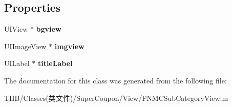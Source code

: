 \subsection*{Properties}
\begin{DoxyCompactItemize}
\item 
\mbox{\label{interface_f_n_m_c_sub_category_cell_a642c00ee41c755f90240331a4d5b038b}} 
U\+I\+View $\ast$ {\bfseries bgview}
\item 
\mbox{\label{interface_f_n_m_c_sub_category_cell_a692966702cc4de449893b8364fd8ad7b}} 
U\+I\+Image\+View $\ast$ {\bfseries imgview}
\item 
\mbox{\label{interface_f_n_m_c_sub_category_cell_a97c7fa8808fdeb4b55b7407a3cd89906}} 
U\+I\+Label $\ast$ {\bfseries title\+Label}
\end{DoxyCompactItemize}


The documentation for this class was generated from the following file\+:\begin{DoxyCompactItemize}
\item 
T\+H\+B/\+Classes(类文件)/\+Super\+Coupon/\+View/F\+N\+M\+C\+Sub\+Category\+View.\+m\end{DoxyCompactItemize}
